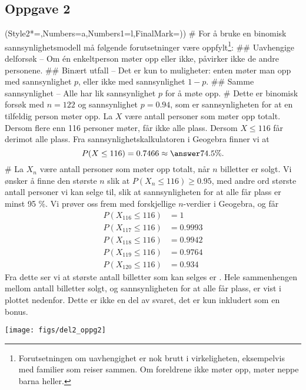 \subsection*{Oppgave 2}
\begin{easylist}[enumerate]
	\ListProperties(Style2*=,Numbers=a,Numbers1=l,FinalMark={)})
	# For å bruke en binomisk sannsynlighetsmodell må følgende forutsetninger være oppfylt\footnote{Forutsetningen om uavhengighet er nok brutt i virkeligheten, eksempelvis med familier som reiser sammen. Om foreldrene ikke møter opp, møter neppe barna heller.}:
	## Uavhengige delforsøk -- Om én enkeltperson møter opp eller ikke, påvirker ikke de andre personene.
	## Binært utfall -- Det er kun to muligheter: enten møter man opp med sannsynlighet $p$, eller ikke med sannsynlighet $1 - p$.
	## Samme sannsynlighet -- Alle har lik sannsynlighet $p$ for å møte opp.
	# Dette er binomisk forsøk med $n = 122$ og sannsynlighet $p = 0.94$, som er sannsynligheten for at en tilfeldig person møter opp. La $X$ være antall personer som møter opp totalt. Dersom flere enn 116 personer møter, får ikke alle plass. Dersom $X \leq 116$ får derimot alle plass.
	Fra sannsynlighetskalkulatoren i Geogebra finner vi at
	\begin{equation*}
		P(X \leq 116) = 0.7466 \approx \answer{74.5 \%}.
	\end{equation*}
	# La $X_n$ være antall personer som møter opp totalt, når $n$ billetter er solgt. Vi ønsker å finne den største $n$ slik at $P(X_n \leq 116) \geq 0.95$, med andre ord største antall personer vi kan selge til, slik at sannsynligheten for at alle får plass er minst 95 \%.
	Vi prøver oss frem med forskjellige $n$-verdier i Geogebra, og får
	\begin{align*}
		P(X_{116} \leq 116) &= 1 \\
		P(X_{117} \leq 116) &= 0.9993 \\
		P(X_{118} \leq 116) &= 0.9942 \\
		P(X_{119} \leq 116) &= 0.9764 \\
		P(X_{120} \leq 116) &= 0.934 
	\end{align*}
	Fra dette ser vi at største antall billetter som kan selges er .
	Hele sammenhengen mellom antall billetter solgt, og sannsynligheten for at alle får plass, er vist i plottet nedenfor. Dette er ikke en del av svaret, det er kun inkludert som en bonus.
	\begin{center}
		\texttt{[image: figs/del2\_oppg2]}
	\end{center}
\end{easylist}


